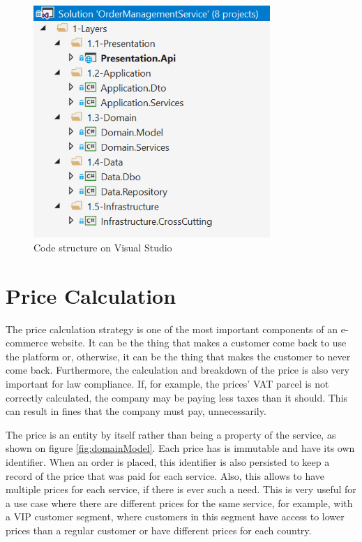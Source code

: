 \begin{figure}[!ht]
\centering
\includegraphics[width=0.8\textwidth,keepaspectratio]{chapters/Implementation/assets/vs-projects.PNG}
\caption[Code structure on Visual Studio]{Code structure on Visual Studio}
\label{fig:vsProjects}
\end{figure}

\section{Price Calculation}
The price calculation strategy is one of the most important components of an e-commerce website. It can be the thing that makes a customer come back to use the platform or, otherwise, it can be the thing that makes the customer to never come back. Furthermore, the calculation and breakdown of the price is also very important for law compliance. If, for example, the prices' \gls{VAT} parcel is not correctly calculated, the company may be paying less taxes than it should. This can result in fines that the company must pay, unnecessarily.

\par
 The price is an entity by itself rather than being a property of the service, as shown on figure \ref{fig:domainModel}. Each price has is immutable and have its own identifier. When an order is placed, this identifier is also persisted to keep a record of the price that was paid for each service. Also, this allows to have multiple prices for each service, if there is ever such a need. This is very useful for a use case where there are different prices for the same service, for example, with a \gls{VIP} customer segment, where customers in this segment have access to lower prices than a regular customer or have different prices for each country.

